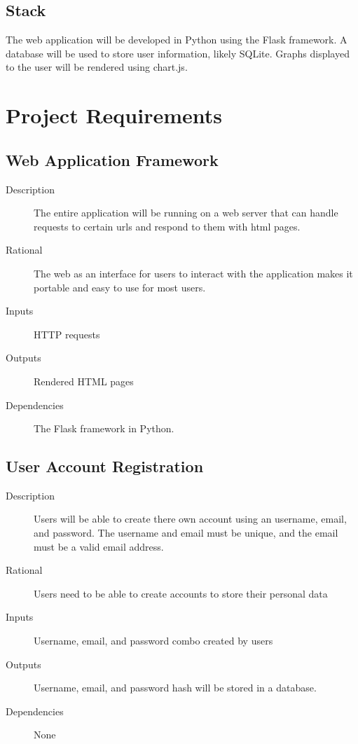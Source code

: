 \documentclass[12pt]{article}
\begin{document}
\subsection{Stack}
The web application will be developed in Python using the Flask framework. A database will be used to store user information, likely SQLite. Graphs displayed to the user will be rendered using chart.js.


\section{Project Requirements}

\subsection{Web Application Framework}
\begin{description}
	\item[Description] The entire application will be running on a web server that can handle requests to certain urls and respond to them with html pages.
	\item[Rational] The web as an interface for users to interact with the application makes it portable and easy to use for most users.
	\item[Inputs] HTTP requests
	\item[Outputs] Rendered HTML pages
	\item[Dependencies] The Flask framework in Python.
\end{description}

\subsection{User Account Registration}
\begin{description}
	\item[Description] Users will be able to create there own account using an username, email, and password. The username and email must be unique, and the email must be a valid email address.
	\item[Rational] Users need to be able to create accounts to store their personal data
	\item[Inputs] Username, email, and password combo created by users
	\item[Outputs] Username, email, and password hash will be stored in a database.
	\item[Dependencies] None
\end{description}
\end{document}
